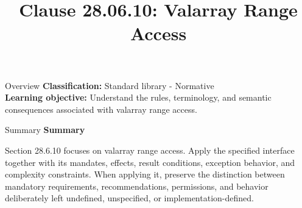 \documentclass[10pt,letterpaper]{article}
\title{Clause 28.06.10: Valarray Range Access}
\author{}
\date{}
\begin{document}
\maketitle
\begin{CornellOverviewBox}{Overview}
\textbf{Classification:} Standard library - Normative\\[2pt]
\textbf{Learning objective:} Understand the rules, terminology, and semantic consequences associated with valarray range access.
\end{CornellOverviewBox}\begin{CornellSummaryBox}{Summary}
{\sffamily\bfseries\color{Accent} Summary}\par\vspace{3pt}Section 28.6.10 focuses on valarray range access. Apply the specified interface together with its mandates, effects, result conditions, exception behavior, and complexity constraints. When applying it, preserve the distinction between mandatory requirements, recommendations, permissions, and behavior deliberately left undefined, unspecified, or implementation-defined.
\end{CornellSummaryBox}
\end{document}
